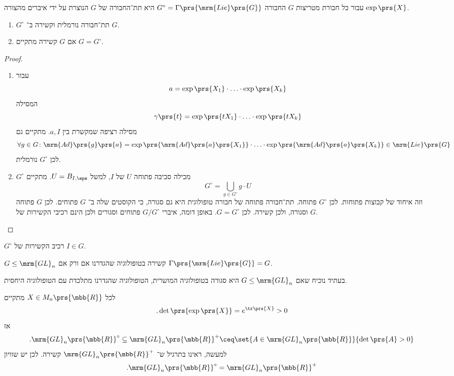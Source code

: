 \documentclass[10pt, twoside]{book}
\begin{document}
עבור כל חבורת מטריצות
$G$
החבורה
$G^\circ = \Gamma\prs{\mrm{Lie}\prs{G}}$
היא תת־החבורה של
$G$
הנוצרת על ידי איברים מהצורה
$\exp\prs{X}$.

\begin{proposition}
\begin{enumerate}
\item $G^\circ$
תת־חבורה נורמלית וקשירה ב־%
$G$.
\item אם
$G$
קשירה מתקיים
$G = G^\circ$.
\end{enumerate}
\end{proposition}

\begin{proof}
\begin{enumerate}
\item עבור
\[a = \exp\prs{X_1} \cdot \ldots \cdot \exp\prs{X_k}\]
המסילה
\[\gamma\prs{t} = \exp\prs{t X_1} \cdot \ldots \cdot \exp\prs{t X_k}\]
מסילה רציפה שמקשרת בין
$a,I$.
מתקיים גם
\[\forall g \in G \colon \mrm{Ad}\prs{g}\prs{a} = \exp\prs{\mrm{Ad}\prs{a}\prs{X_1}} \cdot \ldots \cdot \exp\prs{\mrm{Ad}\prs{a} \prs{X_k}} \in \mrm{Lie}\prs{G}\]
לכן
$G^\circ$
נורמלית.
\item
$G^\circ$
מכילה סביבה פתוחה
$U$
של
$I$,
למשל
$U = B_{I,\eps}$.
מתקיים
\[G^\circ = \bigcup_{g \in G^\circ} g \cdot U\]
וזה איחוד של קבוצות פתוחות. לכן
$G^\circ$
פתוחה.
תת־חבורה פתוחה של חבורה טופולוגית היא גם סגורה, כי הקוסטים שלה ב־%
$G$
פתוחים.
לכן
$G$
פתוחה וסגורה, ולכן קשירה. לכן
$G = G^\circ$.
באופן דומה, איברי
$G/G^\circ$
פתוחים וסגורים ולכן הינם רכיבי הקשירות של
$G$.
\end{enumerate}
\end{proof}

\begin{corollary}
$G^\circ$
רכיב הקשירות של
$I \in G$.
\end{corollary}

\begin{corollary}
$G \leq \mrm{GL}_n$
קשירה בטופולוגיה שהגדרנו אם ורק אם
$\Gamma\prs{\mrm{Lie}\prs{G}} = G$.
\end{corollary}

\begin{remark}
בעתיד נוכיח שאם
$G \leq \mrm{GL}_n$
היא סגורה בטופולוגיה המושרית, הטופולוגיה שהגדרנו מתלכדת עם הטופולוגיה היחסית.
\end{remark}

\begin{example}
לכל
$X \in M_n\prs{\mbb{R}}$
מתקיים
\[\text{.} \det\prs{\exp\prs{X}} = e^{\tr\prs{X}} > 0\]
אז
\[\text{.}\mrm{GL}_n\prs{\mbb{R}}^\circ \subseteq \mrm{GL}_n\prs{\mbb{R}}^+ \ceq \set{A \in \mrm{GL}_n\prs{\mbb{R}}}{\det\prs{A} > 0}\]
למעשה, ראינו בתרגיל ש־%
$\mrm{GL}_n\prs{\mbb{R}}^+$
קשירה.
לכן יש שוויון
\[\text{.} \mrm{GL}_n\prs{\mbb{R}}^\circ = \mrm{GL}_n\prs{\mbb{R}}^+\]
\end{example}
\end{document}
